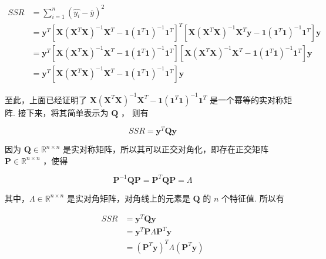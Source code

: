 \documentclass[UTF8]{ctexart}
\begin{document}
    \begin{equation}
    	\begin{aligned}
    		SSR & = \sum_{i=1}^{n} {(\hat{y_{i}} - \overline{y})^2} \\
    		& = \boldsymbol{y}^T [\boldsymbol{X} (\boldsymbol{X}^T \boldsymbol{X})^{-1} \boldsymbol{X}^T - \boldsymbol{1}  (\boldsymbol{1}^T \boldsymbol{1})^{-1} \boldsymbol{1}^T ]^T [\boldsymbol{X} (\boldsymbol{X}^T \boldsymbol{X})^{-1} \boldsymbol{X}^T \boldsymbol{y} - \boldsymbol{1}  (\boldsymbol{1}^T \boldsymbol{1})^{-1} \boldsymbol{1}^T] \boldsymbol{y} \\
    		& = \boldsymbol{y}^T [\boldsymbol{X} (\boldsymbol{X}^T \boldsymbol{X})^{-1} \boldsymbol{X}^T - \boldsymbol{1}  (\boldsymbol{1}^T \boldsymbol{1})^{-1} \boldsymbol{1}^T ] [\boldsymbol{X} (\boldsymbol{X}^T \boldsymbol{X})^{-1} \boldsymbol{X}^T - \boldsymbol{1}  (\boldsymbol{1}^T \boldsymbol{1})^{-1} \boldsymbol{1}^T] \boldsymbol{y} \\
    		& = \boldsymbol{y}^T [\boldsymbol{X} (\boldsymbol{X}^T \boldsymbol{X})^{-1} \boldsymbol{X}^T - \boldsymbol{1} (\boldsymbol{1}^T \boldsymbol{1})^{-1} \boldsymbol{1}^T] \boldsymbol{y}
    	\end{aligned}
    \end{equation}

    至此，上面已经证明了 $ \boldsymbol{X} (\boldsymbol{X}^T \boldsymbol{X})^{-1} \boldsymbol{X}^T - \boldsymbol{1}  (\boldsymbol{1}^T \boldsymbol{1})^{-1} \boldsymbol{1}^T $ 是一个幂等的实对称矩阵. 接下来，将其简单表示为 $ \boldsymbol{Q} $ ， 则有
    
    \begin{equation}
    	SSR = \boldsymbol{y}^T \boldsymbol{Q} \boldsymbol{y}
    \end{equation}
    

    因为 $ \boldsymbol{Q} \in \mathbb{R}^{n \times n} $ 是实对称矩阵，所以其可以正交对角化，即存在正交矩阵$ \boldsymbol{P} \in \mathbb{R}^{n \times n} $ ，使得
    
    \begin{equation}
        \boldsymbol{P}^{-1} \boldsymbol{Q} \boldsymbol{P} = \boldsymbol{P}^T \boldsymbol{Q} \boldsymbol{P} = \boldsymbol{\varLambda} 
    \end{equation}

    其中，$ \boldsymbol{\varLambda} \in \mathbb{R}^{n \times n} $ 是实对角矩阵，对角线上的元素是 $ \boldsymbol{Q} $ 的 $ n $ 个特征值. 所以有
    
    \begin{equation}
    	\begin{aligned}
    		SSR & = \boldsymbol{y}^T \boldsymbol{Q} \boldsymbol{y} \\
    		& =  \boldsymbol{y}^T \boldsymbol{P} \boldsymbol{\varLambda} \boldsymbol{P}^T \boldsymbol{y} \\
    		& = (\boldsymbol{P}^T \boldsymbol{y})^T \boldsymbol{\varLambda} (\boldsymbol{P}^T \boldsymbol{y})
    	\end{aligned}
    \end{equation}
\end{document}
